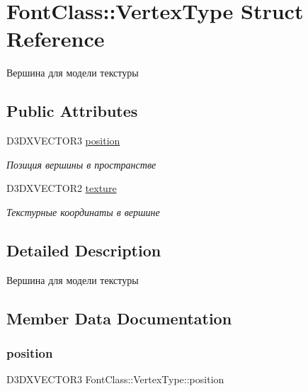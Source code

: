 \hypertarget{struct_font_class_1_1_vertex_type}{}\section{Font\+Class\+:\+:Vertex\+Type Struct Reference}
\label{struct_font_class_1_1_vertex_type}


Вершина для модели текстуры  


\subsection*{Public Attributes}
\begin{DoxyCompactItemize}
\item 
D3\+D\+X\+V\+E\+C\+T\+O\+R3 \hyperlink{struct_font_class_1_1_vertex_type_ad7b3cedbfdb873d497f2c0a23eab7dc1}{position}
\begin{DoxyCompactList}\small\item\em Позиция вершины в пространстве \end{DoxyCompactList}\item 
D3\+D\+X\+V\+E\+C\+T\+O\+R2 \hyperlink{struct_font_class_1_1_vertex_type_afe93fdaa5fbe52e3b317f0e726a5155b}{texture}
\begin{DoxyCompactList}\small\item\em Текстурные координаты в вершине \end{DoxyCompactList}\end{DoxyCompactItemize}


\subsection{Detailed Description}
Вершина для модели текстуры 

\subsection{Member Data Documentation}
\mbox{\label{struct_font_class_1_1_vertex_type_ad7b3cedbfdb873d497f2c0a23eab7dc1}} 
\subsubsection{\texorpdfstring{position}{position}}
{\footnotesize\ttfamily D3\+D\+X\+V\+E\+C\+T\+O\+R3 Font\+Class\+::\+Vertex\+Type\+::position}



